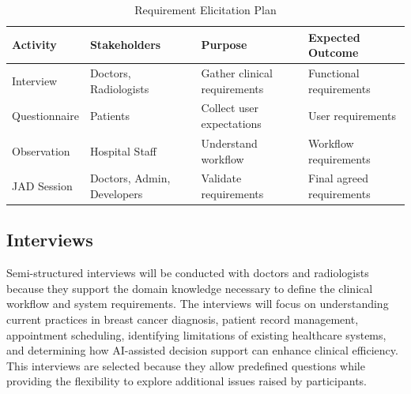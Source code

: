 \documentclass[12pt,a4paper]{report}
\begin{document}
\begin{table}[H]
\centering





\caption{Requirement Elicitation Plan}
\begin{tabular}{|p{3cm}|p{3.5cm}|p{3.5cm}|p{4cm}|}
\hline
\textbf{Activity} & \textbf{Stakeholders} & \textbf{Purpose} & \textbf{Expected Outcome} \\
\hline
Interview & Doctors, Radiologists & Gather clinical requirements & Functional requirements \\
\hline
Questionnaire & Patients & Collect user expectations & User requirements \\
\hline
Observation & Hospital Staff & Understand workflow & Workflow requirements \\
\hline
JAD Session & Doctors, Admin, Developers & Validate requirements & Final agreed requirements \\
\hline
\end{tabular}
\end{table}

\subsection{Interviews}

Semi-structured interviews will be conducted with doctors and radiologists because they support the domain knowledge necessary to define the clinical workflow and system requirements. The interviews will focus on understanding current practices in breast cancer diagnosis, patient record management, appointment scheduling, identifying limitations of existing healthcare systems, and determining how AI-assisted decision support can enhance clinical efficiency. This interviews are selected because they allow predefined questions while providing the flexibility to explore additional issues raised by participants.
\end{document}
